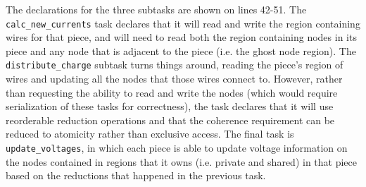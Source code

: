 The declarations for the three subtasks are shown on lines 42-51.  The 
{\tt calc\_new\_currents} task declares that it will read and write the region containing wires
for that piece, and will need to read both the region containing nodes in its piece and any
node that is adjacent to the piece (i.e. the ghost node region).  
The {\tt distribute\_charge} subtask turns things around, reading the piece's 
region of wires and updating all the nodes that those wires connect to.  However,
rather than requesting the ability to read and write the nodes (which would
require serialization of these tasks for correctness), the task declares that
it will use reorderable reduction operations and that the coherence requirement
can be reduced to atomicity rather than exclusive access. The final task is 
{\tt update\_voltages}, in which each piece is able to update
voltage information on the nodes contained in regions that it owns (i.e. private and shared)
in that piece based on the reductions that happened in the previous task.  
  





